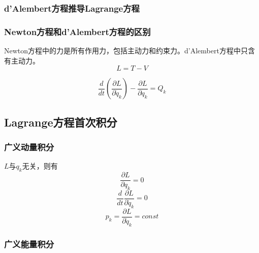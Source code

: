 \documentclass[12pt]{article}
\numberwithin{equation}{section}
\begin{document}
	    \subsubsection{d'Alembert方程推导Lagrange方程}

        \subsubsection{Newton方程和d'Alembert方程的区别}
        Newton方程中的力是所有作用力，包括主动力和约束力。d'Alembert方程中只含有主动力。
        \begin{equation}
            L=T-V
        \end{equation}

        \begin{equation}
            \frac{d}{dt}\left(\frac{\partial L}{\partial \dot{q}_k}\right)-\frac{\partial L}{\partial q_k}=Q_k
        \end{equation}

        \subsection{Lagrange方程首次积分}

        \subsubsection{广义动量积分}
        $L$与$q_k$无关，则有
        \begin{equation}
            \frac{\partial L}{\partial q_k}=0
        \end{equation}
        \begin{equation}
            \frac{d}{dt}\frac{\partial L}{\partial \dot{q}_k}=0
        \end{equation}
        \begin{equation}
            p_k=\frac{\partial L}{\partial \dot{q}_k}=const
        \end{equation}

        \subsubsection{广义能量积分}
\end{document}
